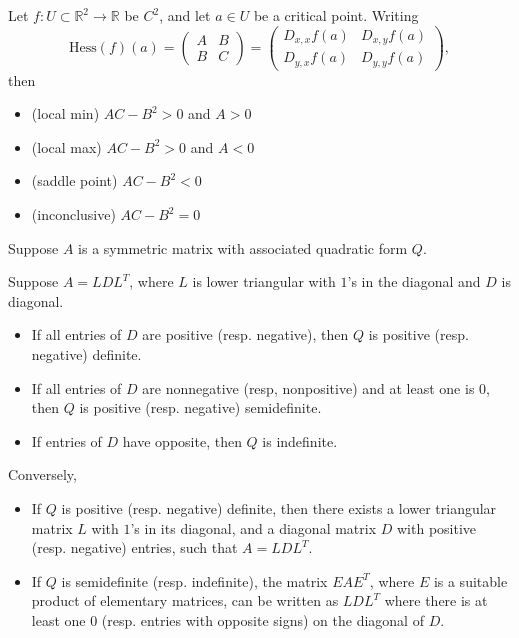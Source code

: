 \documentclass[12pt]{article}
\begin{document}
\begin{corollary}
	Let $f:U\subset\mathbb{R}^2\to\mathbb{R}$ be $C^2$, and let $a\in U$ be a critical point. Writing 
	\begin{equation*}
		\text{Hess}(f)(a) = \begin{pmatrix} A & B \\ B & C \end{pmatrix} = \begin{pmatrix} D_{x,x}f(a) & D_{x,y}f(a) \\ D_{y,x}f(a) & D_{y,y}f(a) \end{pmatrix},
	\end{equation*}
	then 
	\begin{itemize}
		\item (local min) $AC-B^2>0$ and $A>0$
		\item (local max) $AC-B^2>0$ and $A<0$
		\item (saddle point) $AC-B^2<0$
		\item (inconclusive) $AC-B^2=0$
	\end{itemize}
\end{corollary}

\begin{proposition}
	Suppose $A$ is a symmetric matrix with associated quadratic form $Q$.

	Suppose $A = LDL^T$, where $L$ is lower triangular with $1$'s in the diagonal and $D$ is diagonal.
	\begin{itemize}
		\item If all entries of $D$ are positive (resp. negative), then $Q$ is positive (resp. negative) definite.
		\item If all entries of $D$ are nonnegative (resp, nonpositive) and at least one is $0$, then $Q$ is positive (resp. negative) semidefinite.
		\item If entries of $D$ have opposite, then $Q$ is indefinite.
	\end{itemize}

	Conversely,
	\begin{itemize}
		\item If $Q$ is positive (resp. negative) definite, then there exists a lower triangular matrix $L$ with $1$'s in its diagonal, and a diagonal matrix $D$ with positive (resp. negative) entries, such that $A=LDL^T$.
		\item If $Q$ is semidefinite (resp. indefinite), the matrix $EAE^T$, where $E$ is a suitable product of elementary matrices, can be written as $LDL^T$ where there is at least one $0$ (resp. entries with opposite signs) on the diagonal of $D$.
	\end{itemize}
\end{proposition}
\end{document}
